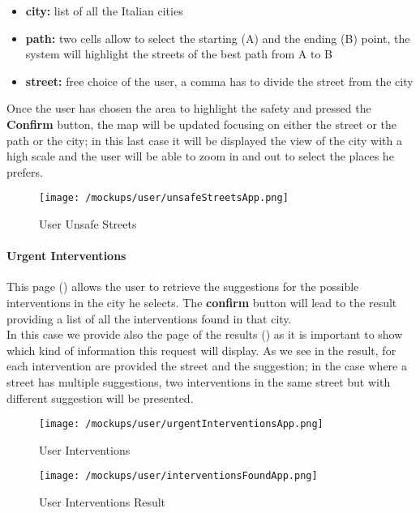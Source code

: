 			\begin{itemize}
				\item \textbf{city:} list of all the Italian cities
				\item \textbf{path:} two cells allow to select the starting (A) and the ending (B) point, the system will highlight the streets of the best path from A to B
				\item \textbf{street:} free choice of the user, a comma has to divide the street from the city
			\end{itemize}
		
			Once the user has chosen the area to highlight the safety and pressed the \textbf{Confirm} button, the map will be updated focusing on either the street or the path or the city; in this last case it will be displayed the view of the city with a high scale and the user will be able to zoom in and out to select the places he prefers.
			
			\begin{figure}[ht!]
				\centering
				\texttt{[image: /mockups/user/unsafeStreetsApp.png]}
				\caption{\label{fig:unsafeStreetsApp} User Unsafe Streets}
			\end{figure}
		
			\paragraph{Urgent Interventions}
			This page () allows the user to retrieve the suggestions for the possible interventions in the city he selects. The \textbf{confirm} button will lead to the result providing a list of all the interventions found in that city.\\
			
			In this case we provide also the page of the results () as it is important to show which kind of information this request will display. As we see in the result, for each intervention are provided the street and the suggestion; in the case where a street has multiple suggestions, two interventions in the same street but with different suggestion will be presented.
			
			\vspace{0.6cm}
			
			\begin{figure}[ht!]
				\centering
				\begin{minipage}{0.5\textwidth}
					\centering
					\texttt{[image: /mockups/user/urgentInterventionsApp.png]}
					\caption{\label{fig:urgentInterventionsApp} User Interventions}
				\end{minipage}\hfill
				\begin{minipage}{0.5\textwidth}
					\centering
					\texttt{[image: /mockups/user/interventionsFoundApp.png]}
					\caption{\label{fig:interventionsFoundApp} User Interventions Result}
				\end{minipage}
			\end{figure}
		
